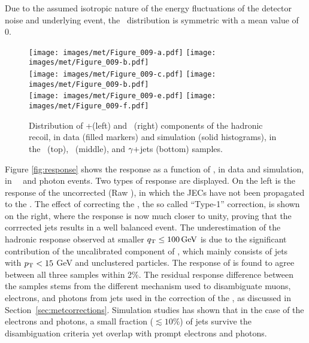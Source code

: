 Due to the assumed isotropic nature of the energy fluctuations of the detector noise and underlying event, the \uperp\ distribution is symmetric with a mean value of 0. 
\begin{figure}[htbp!]
  \centering
  \texttt{[image: images/met/Figure\_009-a.pdf]}
  \texttt{[image: images/met/Figure\_009-b.pdf]}\\
  \texttt{[image: images/met/Figure\_009-c.pdf]}
  \texttt{[image: images/met/Figure\_009-b.pdf]}\\
  \texttt{[image: images/met/Figure\_009-e.pdf]}
  \texttt{[image: images/met/Figure\_009-f.pdf]}
  \caption{Distribution of \upar+\qt (left) and \uperp\ (right) components of the hadronic recoil, in data (filled markers) and simulation (solid histograms), in the \Zmm\ (top), \Zee\ (middle), and $\gamma+$jets (bottom) samples.} 
  \label{fig:uparuperp}
\end{figure}
\newpara
\noindent\justify
Figure \ref{fig:response} shows the \ptmiss response as a function of \qt, in data and simulation, in \Zmm\, \Zee\, and photon events. 
Two types of response are displayed. 
On the left is the response of the uncorrected \ptmiss (Raw \ptmiss), in which the JECs have not been propagated to the \ptmiss. 
The effect of correcting the \ptmiss, the so called ``Type-1'' correction, is shown on the right, where the response is now much closer to unity, proving that the corrrected jets results in a well balanced event. 
The underestimation of the hadronic response observed at smaller ${q}_{\mathrm T} \leq 100\,\text{Ge\hspace{-.08em}V}$ is due to the significant contribution of the uncalibrated component of \ptmiss, which mainly consists of jets with $p_{\mathrm{T}} < 15$ GeV and unclustered particles. 
The response of \ptmiss is found to agree between all three samples within 2\%. 
The residual response difference between the samples stems from the different mechanism used to disambiguate muons, electrons, and photons from jets used in the correction of the \ptmiss, as discussed in Section~\ref{sec:metcorrections}. 
Simulation studies has shown that in the case of the electrons and photons, a small fraction ($\lesssim 10\%$) of jets survive the disambiguation criteria yet overlap with prompt electrons and photons. 
